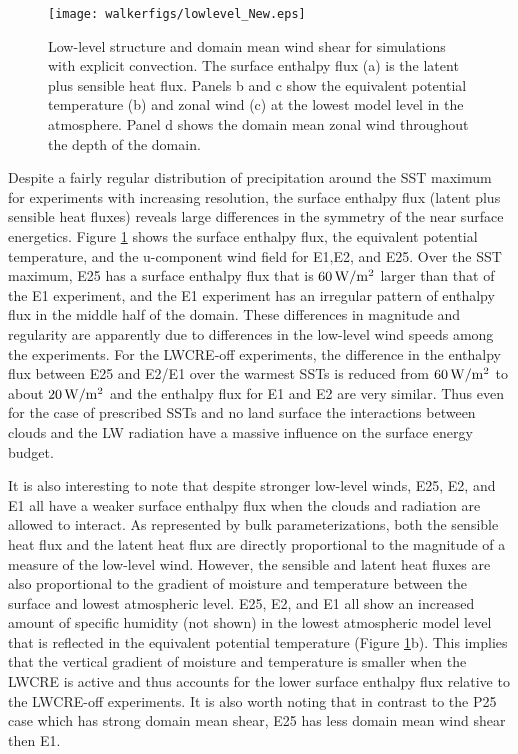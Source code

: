\documentclass[draft]{agujournal2019}
\begin{document}
{\begin{figure}
  \centering       
    \texttt{[image: walkerfigs/lowlevel\_New.eps]}
    \caption{Low-level structure and domain mean wind shear for simulations with explicit convection.  
    The surface enthalpy flux (a) is the latent plus sensible heat flux.  Panels b and c show 
    the equivalent potential temperature (b) and zonal wind (c) at the lowest model level in the atmosphere.  Panel 
    d shows the domain mean zonal wind throughout the depth of the domain.}
    \label{fig:enthalpy}
\end{figure}

Despite a fairly regular distribution of precipitation around the SST maximum for experiments with increasing resolution, the 
surface enthalpy flux (latent plus sensible heat fluxes) reveals large differences in the symmetry of the near surface energetics.   
Figure \ref{fig:enthalpy} shows the surface enthalpy flux, 
the equivalent potential temperature, and the u-component wind field for E1,E2, and E25.  
Over the SST maximum, E25 has a surface enthalpy flux that is $60 \, \rm{W/m^2}$ 
larger than that of the E1 experiment, and the E1 experiment has an irregular pattern of enthalpy flux in the middle
half of the domain.  These differences in magnitude and regularity are apparently due to differences in the low-level 
wind speeds among the experiments.  For the LWCRE-off experiments, the difference in the enthalpy flux between E25 and E2/E1 
over the warmest SSTs is reduced from $60 \, \rm{W/m^2}$ to about $20 \, \rm{W/m^2}$ and the enthalpy
flux for E1 and  E2 are very similar.   Thus even for the case of prescribed SSTs and no
land surface the interactions between clouds and the LW radiation have a massive influence on the 
surface energy budget.


It is also interesting to note that despite stronger low-level winds, E25, E2, and E1 all have a weaker surface
enthalpy flux when the clouds and radiation are allowed to interact.   As represented 
by bulk parameterizations, both the sensible heat flux and the latent heat flux are directly proportional to the 
magnitude of a measure of the low-level wind.  However, the sensible and latent heat fluxes are also 
proportional to the gradient of moisture and temperature between the surface and lowest atmospheric level.    
E25, E2, and E1 all show an increased amount of specific humidity (not shown) in the lowest atmospheric 
model level that is reflected in the equivalent potential temperature (Figure \ref{fig:enthalpy}b).  This 
implies that the vertical gradient of moisture and temperature is smaller when the LWCRE is active and thus accounts 
for the lower surface enthalpy flux relative to the LWCRE-off experiments.         
It is also worth noting that in contrast to the P25 case which has strong domain mean shear, E25 has less domain 
mean wind shear then E1.  

}
\end{document}
